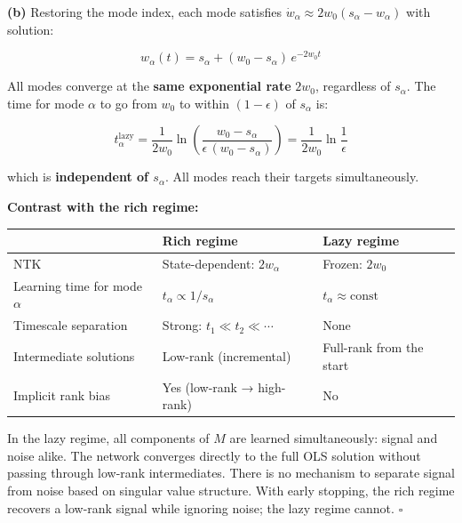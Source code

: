 \documentclass[
]{article}
\newcounter{none} %
\begin{document}
\textbf{(b)} Restoring the mode index, each mode satisfies
\(\dot{w}_\alpha \approx 2w_0(s_\alpha - w_\alpha)\) with solution:

\[w_\alpha(t) = s_\alpha + (w_0 - s_\alpha)\,e^{-2w_0 t}\]

All modes converge at the \textbf{same exponential rate} \(2w_0\),
regardless of \(s_\alpha\). The time for mode \(\alpha\) to go from
\(w_0\) to within \((1-\epsilon)\) of \(s_\alpha\) is:

\[t_\alpha^{\text{lazy}} = \frac{1}{2w_0}\ln\!\left(\frac{w_0 - s_\alpha}{\epsilon\,(w_0 - s_\alpha)}\right) = \frac{1}{2w_0}\ln\frac{1}{\epsilon}\]

which is \textbf{independent of \(s_\alpha\)}. All modes reach their
targets simultaneously.

\textbf{Contrast with the rich regime:}

{\def\LTcaptype{none} %
\begin{longtable}[]{@{}
  >{\raggedright\arraybackslash}p{}
  >{\raggedright\arraybackslash}p{}
  >{\raggedright\arraybackslash}p{}@{}}
\toprule\noalign{}
\begin{minipage}[b]{\linewidth}\raggedright
\end{minipage} & \begin{minipage}[b]{\linewidth}\raggedright
Rich regime
\end{minipage} & \begin{minipage}[b]{\linewidth}\raggedright
Lazy regime
\end{minipage} \\
\midrule\noalign{}
\endhead
\bottomrule\noalign{}
\endlastfoot
NTK & State-dependent: \(2w_\alpha\) & Frozen: \(2w_0\) \\
Learning time for mode \(\alpha\) & \(t_\alpha \propto 1/s_\alpha\) &
\(t_\alpha \approx \text{const}\) \\
Timescale separation & Strong: \(t_1 \ll t_2 \ll \cdots\) & None \\
Intermediate solutions & Low-rank (incremental) & Full-rank from the
start \\
Implicit rank bias & Yes (low-rank → high-rank) & No \\
\end{longtable}
}

In the lazy regime, all components of \(M\) are learned simultaneously:
signal and noise alike. The network converges directly to the full OLS
solution without passing through low-rank intermediates. There is no
mechanism to separate signal from noise based on singular value
structure. With early stopping, the rich regime recovers a low-rank
signal while ignoring noise; the lazy regime cannot. \(\square\)
\end{document}
